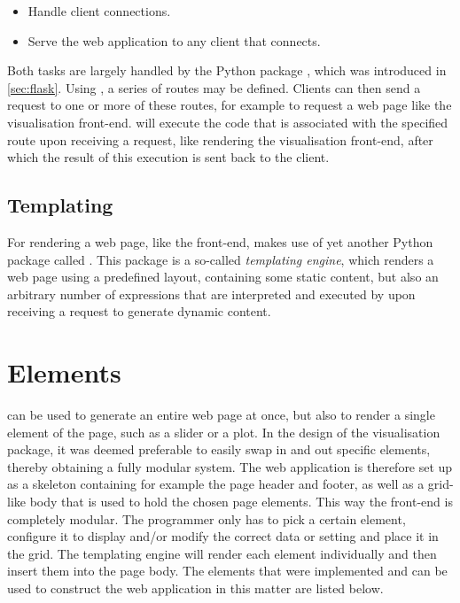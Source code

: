 \documentclass[a4paper, openany, oneside]{memoir}
\begin{document}
\begin{itemize}
	\item Handle client connections.
	\item Serve the web application to any client that connects.
\end{itemize}

Both tasks are largely handled by the Python package , which was introduced in \cref{sec:flask}. Using , a series of routes may be defined. Clients can then send a request to one or more of these routes, for example to request a web page like the visualisation front-end.  will execute the code that is associated with the specified route upon receiving a request, like rendering the visualisation front-end, after which the result of this execution is sent back to the client.

\subsection{Templating}
\label{sec:templating}
For rendering a web page, like the front-end,  makes use of yet another Python package called . This package is a so-called \emph{templating engine}, which renders a web page using a predefined layout, containing some static content, but also an arbitrary number of expressions that are interpreted and executed by  upon receiving a request to generate dynamic content.

\section{Elements}
\label{sec:elements}
 can be used to generate an entire web page at once, but also to render a single element of the page, such as a slider or a plot. In the design of the visualisation package, it was deemed preferable to easily swap in and out specific elements, thereby obtaining a fully modular system. The web application is therefore set up as a skeleton containing for example the page header and footer, as well as a grid-like body that is used to hold the chosen page elements. This way the front-end is completely modular. The programmer only has to pick a certain element, configure it to display and/or modify the correct data or setting and place it in the grid. The templating engine will render each element individually and then insert them into the page body. The elements that were implemented and can be used to construct the web application in this matter are listed below.
\end{document}
